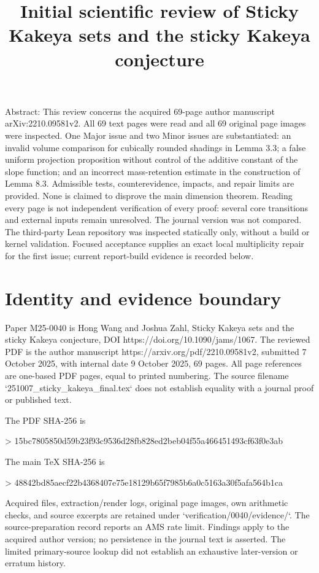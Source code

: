 \documentclass[10pt]{article}
\title{Initial scientific review of Sticky Kakeya sets and the sticky Kakeya conjecture}
\author{}
\date{}
\begin{document}
\maketitle
Abstract: This review concerns the acquired 69-page author manuscript arXiv:2210.09581v2. All 69 text pages were read and all 69 original page images were inspected. One Major issue and two Minor issues are substantiated: an invalid volume comparison for cubically rounded shadings in Lemma 3.3; a false uniform projection proposition without control of the additive constant of the slope function; and an incorrect mass-retention estimate in the construction of Lemma 8.3. Admissible tests, counterevidence, impacts, and repair limits are provided. None is claimed to disprove the main dimension theorem. Reading every page is not independent verification of every proof: several core transitions and external inputs remain unresolved. The journal version was not compared. The third-party Lean repository was inspected statically only, without a build or kernel validation. Focused acceptance supplies an exact local multiplicity repair for the first issue; current report-build evidence is recorded below.\par
\section*{Identity and evidence boundary}
Paper M25-0040 is Hong Wang and Joshua Zahl, Sticky Kakeya sets and the sticky Kakeya conjecture, DOI https://doi.org/10.1090/jams/1067. The reviewed PDF is the author manuscript https://arxiv.org/pdf/2210.09581v2, submitted 7 October 2025, with internal date 9 October 2025, 69 pages. All page references are one-based PDF pages, equal to printed numbering. The source filename `251007\_sticky\_kakeya\_final.tex` does not establish equality with a journal proof or published text.\par
The PDF SHA-256 is\par
> 15bc7805850d59b23f93c9536d28fb828ed2beb04f55a466451493cf63f0e3ab\par
The main TeX SHA-256 is\par
> 48842bd85aecf22b4368407e75e18129b65f7985b6a0c5163a30f5afa564b1ca\par
Acquired files, extraction/render logs, original page images, own arithmetic checks, and source excerpts are retained under `verification/0040/evidence/`. The source-preparation record reports an AMS rate limit. Findings apply to the acquired author version; no persistence in the journal text is asserted. The limited primary-source lookup did not establish an exhaustive later-version or erratum history.\par
\end{document}
